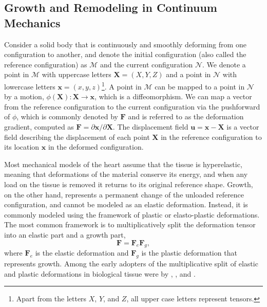 \subsection{Growth and Remodeling in Continuum Mechanics}
Consider a solid body that is continuously and smoothly deforming from one configuration to another, and denote the initial configuration (also called the reference configuration) as $\mathcal{M}$ and the current configuration $\mathcal{N}$. We denote a point in $\mathcal{M}$ with uppercase letters $\mathbf{X} = (X, Y, Z)$ and a point in $\mathcal{N}$ with lowercase letters $\mathbf{x} = (x, y, z)$\footnote{Apart from the letters $X$, $Y$, and $Z$, all upper case letters represent tensors.}. A point in $\mathcal{M}$ can be mapped to a point in $\mathcal{N}$ by a motion, $\phi(\mathbf{X}): \mathbf{X} \rightarrow \mathbf{x}$, which is a diffeomorphism. We can map a vector from the reference configuration to the current configuration via the pushforward of $\phi$, which is commonly denoted by $\mathbf{F}$ and is referred to as the deformation gradient, computed as $\mathbf{F} = \partial\mathbf{x}/\partial\mathbf{X}$. The displacement field $\mathbf{u} = \mathbf{x} - \mathbf{X}$ is a vector field describing the displacement of each point $\mathbf{X}$ in the reference configuration to its location $\mathbf{x}$ in the deformed configuration. \par 
Most mechanical models of the heart assume that the tissue is hyperelastic, meaning that deformations of the material conserve its energy, and when any load on the tissue is removed it returns to its original reference shape. Growth, on the other hand, represents a permanent change of the unloaded reference configuration, and cannot be modeled as an elastic deformation. Instead, it is commonly modeled using the framework of plastic or elasto-plastic deformations. The most common framework is to multiplicatively split the deformation tensor into an elastic part and a growth part, 
\begin{equation}
\label{eq: multiplicative split}
    \mathbf{F} = \mathbf{F}_e\mathbf{F}_g,
\end{equation}
where $\mathbf{F}_e$ is the elastic deformation and $\mathbf{F}_g$ is the plastic deformation that represents growth. Among the early adopters of the multiplicative split of elastic and plastic deformations in biological tissue were by \citep{Kondaurov1987}, \citep{Takamizawa1990}, and \citep{Rodriguez1994}. \par 
